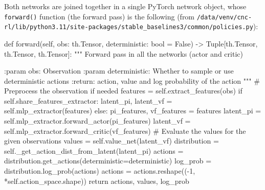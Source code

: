 \documentclass[
  letterpaper,
  DIV=11,
  numbers=noendperiod]{scrartcl}
\newenvironment{Shaded}{\begin{snugshade}}{\end{snugshade}}
\newcommand{\BuiltInTok}[1]{\textcolor[rgb]{0.00,0.23,0.31}{#1}}
\newcommand{\CommentTok}[1]{\textcolor[rgb]{0.37,0.37,0.37}{#1}}
\newcommand{\ControlFlowTok}[1]{\textcolor[rgb]{0.00,0.23,0.31}{#1}}
\newcommand{\DecValTok}[1]{\textcolor[rgb]{0.68,0.00,0.00}{#1}}
\newcommand{\KeywordTok}[1]{\textcolor[rgb]{0.00,0.23,0.31}{#1}}
\newcommand{\NormalTok}[1]{\textcolor[rgb]{0.00,0.23,0.31}{#1}}
\newcommand{\OperatorTok}[1]{\textcolor[rgb]{0.37,0.37,0.37}{#1}}
\newcommand{\VariableTok}[1]{\textcolor[rgb]{0.07,0.07,0.07}{#1}}
\begin{document}
Both networks are joined together in a single PyTorch network object,
whose \texttt{forward()} function (the forward pass) is the following
(from
\texttt{/data/venv/cnc-rl/lib/python3.11/site-packages/stable\_baselines3/common/policies.py}):

\begin{Shaded}
\begin{Highlighting}[]
\KeywordTok{def}\NormalTok{ forward(}\VariableTok{self}\NormalTok{, obs: th.Tensor, deterministic: }\BuiltInTok{bool} \OperatorTok{=} \VariableTok{False}\NormalTok{) }\OperatorTok{{-}\textgreater{}}\NormalTok{ Tuple[th.Tensor, th.Tensor, th.Tensor]:}
    \CommentTok{"""}
\CommentTok{    Forward pass in all the networks (actor and critic)}

\CommentTok{    :param obs: Observation}
\CommentTok{    :param deterministic: Whether to sample or use deterministic actions}
\CommentTok{    :return: action, value and log probability of the action}
\CommentTok{    """}
    \CommentTok{\# Preprocess the observation if needed}
\NormalTok{    features }\OperatorTok{=} \VariableTok{self}\NormalTok{.extract\_features(obs)}
    \ControlFlowTok{if} \VariableTok{self}\NormalTok{.share\_features\_extractor:}
\NormalTok{        latent\_pi, latent\_vf }\OperatorTok{=} \VariableTok{self}\NormalTok{.mlp\_extractor(features)}
    \ControlFlowTok{else}\NormalTok{:}
\NormalTok{        pi\_features, vf\_features }\OperatorTok{=}\NormalTok{ features}
\NormalTok{        latent\_pi }\OperatorTok{=} \VariableTok{self}\NormalTok{.mlp\_extractor.forward\_actor(pi\_features)}
\NormalTok{        latent\_vf }\OperatorTok{=} \VariableTok{self}\NormalTok{.mlp\_extractor.forward\_critic(vf\_features)}
    \CommentTok{\# Evaluate the values for the given observations}
\NormalTok{    values }\OperatorTok{=} \VariableTok{self}\NormalTok{.value\_net(latent\_vf)}
\NormalTok{    distribution }\OperatorTok{=} \VariableTok{self}\NormalTok{.\_get\_action\_dist\_from\_latent(latent\_pi)}
\NormalTok{    actions }\OperatorTok{=}\NormalTok{ distribution.get\_actions(deterministic}\OperatorTok{=}\NormalTok{deterministic)}
\NormalTok{    log\_prob }\OperatorTok{=}\NormalTok{ distribution.log\_prob(actions)}
\NormalTok{    actions }\OperatorTok{=}\NormalTok{ actions.reshape((}\OperatorTok{{-}}\DecValTok{1}\NormalTok{, }\OperatorTok{*}\VariableTok{self}\NormalTok{.action\_space.shape))}
    \ControlFlowTok{return}\NormalTok{ actions, values, log\_prob}
\end{Highlighting}
\end{Shaded}
\end{document}
